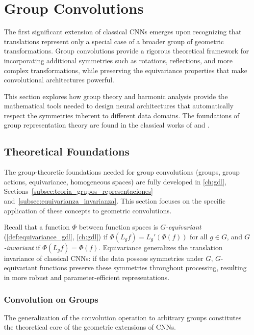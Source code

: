 \section{Group Convolutions}\label{sec:group_convolutions}

The first significant extension of classical \glspl{CNN} emerges upon recognizing that translations represent only a special case of a broader group of geometric transformations. Group convolutions provide a rigorous theoretical framework for incorporating additional symmetries such as rotations, reflections, and more complex transformations, while preserving the equivariance properties that make convolutional architectures powerful.

This section explores how group theory and harmonic analysis provide the mathematical tools needed to design neural architectures that automatically respect the symmetries inherent to different data domains. The foundations of group representation theory are found in the classical works of \citet{Peter1927} and \citet{Serre1977}.

\subsection{Theoretical Foundations}\label{subsec:fundamentos_teoricos}

The group-theoretic foundations needed for group convolutions (groups, group actions, equivariance, homogeneous spaces) are fully developed in \autoref{ch:gdl}, Sections~\ref{subsec:teoria_grupos_representaciones} and~\ref{subsec:equivarianza_invarianza}. This section focuses on the specific application of these concepts to geometric convolutions.

Recall that a function $\Phi$ between function spaces is \textit{$G$-equivariant} (\autoref{def:equivariance_gdl}, \autoref{ch:gdl}) if $\Phi(L_g f) = L_g' (\Phi(f))$ for all $g \in G$, and \textit{$G$-invariant} if $\Phi(L_g f) = \Phi(f)$. Equivariance generalizes the translation invariance of classical \glspl{CNN}: if the data possess symmetries under $G$, $G$-equivariant functions preserve these symmetries throughout processing, resulting in more robust and parameter-efficient representations.

\subsubsection{Convolution on Groups}

The generalization of the convolution operation to arbitrary groups constitutes the theoretical core of the geometric extensions of \glspl{CNN}.

